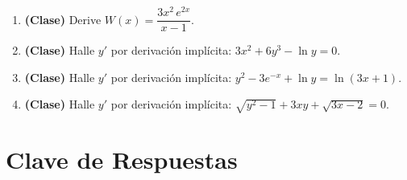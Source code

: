 \documentclass[12pt, letterpaper]{article}
\begin{document}
\begin{enumerate}[leftmargin=*, start=19]
  \item \muyDificil{} \textbf{(Clase)} Derive $W(x) = \dfrac{3x^{2}\,e^{2x}}{x-1}$.

  \item \muyDificil{} \textbf{(Clase)} Halle $y'$ por derivación implícita: $3x^{2} + 6y^{3} - \ln y = 0$.

  \item \muyDificil{} \textbf{(Clase)} Halle $y'$ por derivación implícita: $y^{2} - 3e^{-x} + \ln y = \ln(3x+1)$.

  \item \muyDificil{} \textbf{(Clase)} Halle $y'$ por derivación implícita: $\sqrt{y^{2}-1} + 3xy + \sqrt{3x-2} = 0$.

\end{enumerate}

\newpage
\ifmwclaves
  \section{Clave de Respuestas}
\end{document}
